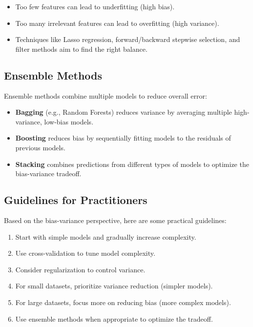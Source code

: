 \documentclass{article}
\begin{document}
\begin{itemize}
\item Too few features can lead to underfitting (high bias).
\item Too many irrelevant features can lead to overfitting (high variance).
\item Techniques like Lasso regression, forward/backward stepwise selection, and filter methods aim to find the right balance.
\end{itemize}

\subsection{Ensemble Methods}

Ensemble methods combine multiple models to reduce overall error:

\begin{itemize}
\item \textbf{Bagging} (e.g., Random Forests) reduces variance by averaging multiple high-variance, low-bias models.
\item \textbf{Boosting} reduces bias by sequentially fitting models to the residuals of previous models.
\item \textbf{Stacking} combines predictions from different types of models to optimize the bias-variance tradeoff.
\end{itemize}

\subsection{Guidelines for Practitioners}

Based on the bias-variance perspective, here are some practical guidelines:

\begin{enumerate}
\item Start with simple models and gradually increase complexity.
\item Use cross-validation to tune model complexity.
\item Consider regularization to control variance.
\item For small datasets, prioritize variance reduction (simpler models).
\item For large datasets, focus more on reducing bias (more complex models).
\item Use ensemble methods when appropriate to optimize the tradeoff.
\end{enumerate}
\end{document}
